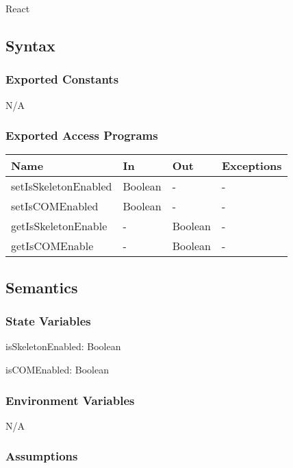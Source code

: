 \documentclass[12pt, titlepage]{article}
\begin{document}
\noindent React

\subsection{Syntax}

\subsubsection{Exported Constants}

N/A

\subsubsection{Exported Access Programs}

\begin{center}
  \begin{tabular}{p{4cm} p{4cm} p{4cm} p{2cm}}
    \hline
    \textbf{Name}              & \textbf{In}   & \textbf{Out}  & \textbf{Exceptions} \\
    \hline
    setIsSkeletonEnabled & Boolean & -       & -             \\
    setIsCOMEnabled      & Boolean & -       & -             \\
    getIsSkeletonEnable  & -       & Boolean & -             \\
    getIsCOMEnable       & -       & Boolean & -             \\
    \hline
  \end{tabular}
\end{center}

\subsection{Semantics}

\subsubsection{State Variables}

\noindent isSkeletonEnabled: Boolean

\noindent isCOMEnabled: Boolean

\subsubsection{Environment Variables}

N/A

\subsubsection{Assumptions}
\end{document}
